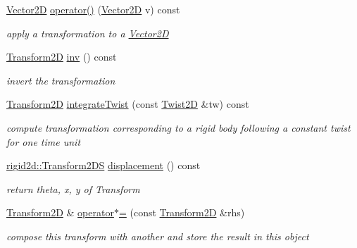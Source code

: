 \begin{DoxyCompactItemize}
\hyperlink{structrigid2d_1_1Vector2D}{Vector2D} \hyperlink{classrigid2d_1_1Transform2D_a80fbe5f0ea600b82812749d3c9e0f219}{operator()} (\hyperlink{structrigid2d_1_1Vector2D}{Vector2D} v) const
\begin{DoxyCompactList}\small\item\em apply a transformation to a \hyperlink{structrigid2d_1_1Vector2D}{Vector2D} \end{DoxyCompactList}\item 
\hyperlink{classrigid2d_1_1Transform2D}{Transform2D} \hyperlink{classrigid2d_1_1Transform2D_a2d324a150b852834b68629159e1b723b}{inv} () const
\begin{DoxyCompactList}\small\item\em invert the transformation \end{DoxyCompactList}\item 
\hyperlink{classrigid2d_1_1Transform2D}{Transform2D} \hyperlink{classrigid2d_1_1Transform2D_a56730e2d2c235e3909361cc0774f1c6e}{integrate\+Twist} (const \hyperlink{classrigid2d_1_1Twist2D}{Twist2D} \&tw) const
\begin{DoxyCompactList}\small\item\em compute transformation corresponding to a rigid body following a constant twist for one time unit \end{DoxyCompactList}\item 
\hyperlink{structrigid2d_1_1Transform2DS}{rigid2d\+::\+Transform2\+DS} \hyperlink{classrigid2d_1_1Transform2D_a2566972da0bb1c13f54b7ba948efd4f7}{displacement} () const
\begin{DoxyCompactList}\small\item\em return theta, x, y of Transform \end{DoxyCompactList}\item 
\hyperlink{classrigid2d_1_1Transform2D}{Transform2D} \& \hyperlink{classrigid2d_1_1Transform2D_a39a7a37c3be80717b8d2fe6cf00c1fbf}{operator$\ast$=} (const \hyperlink{classrigid2d_1_1Transform2D}{Transform2D} \&rhs)
\begin{DoxyCompactList}\small\item\em compose this transform with another and store the result in this object \end{DoxyCompactList}\end{DoxyCompactItemize}
